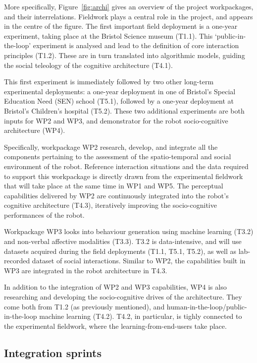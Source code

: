 \documentclass[11pt,a4paper]{report}
\begin{document}
More specifically, Figure~\ref{fig:archi} gives an overview of the project
workpackages, and their interrelations. Fieldwork plays a central role in the
project, and appears in the centre of the figure. The first important field
deployment is a one-year experiment, taking place at the Bristol Science museum
(T1.1). This `public-in-the-loop' experiment is analysed and lead to the
definition of core interaction principles (T1.2). These are in turn translated
into algorithmic models, guiding the social teleology of the cognitive
architecture (T4.1).

This first experiment is immediately followed by two other long-term
experimental deployments: a one-year deployment in one of Bristol's Special
Education Need (SEN) school (T5.1), followed by a one-year deployment at
Bristol's Children's hospital (T5.2). These two additional experiments are both
inputs for WP2 and WP3, and demonstrator for the robot socio-cognitive
architecture (WP4).

Specifically, workpackage WP2 research, develop, and integrate all the components
pertaining to the assessment of the spatio-temporal and social environment of
the robot. Reference interaction situations and the data required to support
this workpackage is directly drawn from the experimental fieldwork that will
take place at the same time in WP1 and WP5. The perceptual capabilities
delivered by WP2 are continuously integrated into the robot's cognitive
architecture (T4.3), iteratively improving the socio-cognitive performances of
the robot.

Workpackage WP3 looks into behaviour generation using machine learning (T3.2)
and non-verbal affective modalities (T3.3). T3.2 is data-intensive, and will use
datasets acquired during the field deployments (T1.1, T5.1, T5.2), as well as
lab-recorded dataset of social interactions. Similar to WP2, the capabilities
built in WP3 are integrated in the robot architecture in T4.3.

In addition to the integration of WP2 and WP3 capabilities, WP4 is also
researching and developing the socio-cognitive drives of the architecture. They
come both from T1.2 (as previously mentioned), and
human-in-the-loop/public-in-the-loop machine learning (T4.2). T4.2, in
particular, is tighly connected to the experimental fieldwork, where the
learning-from-end-users take place.

\subsection{Integration sprints}
\end{document}
